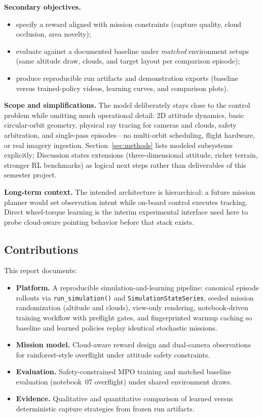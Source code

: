 \textbf{Secondary objectives.}
\begin{itemize}
  \item specify a reward aligned with mission constraints (capture quality, cloud occlusion, area novelty);
  \item evaluate against a documented baseline under \emph{matched} environment setups (same altitude draw, clouds, and target layout per comparison episode);
  \item produce reproducible run artifacts and demonstration exports (baseline versus trained-policy videos, learning curves, and comparison plots).
\end{itemize}

\textbf{Scope and simplifications.}
The model deliberately stays close to the control problem while omitting much operational detail: 2D attitude dynamics, basic circular-orbit geometry, physical ray tracing for cameras and clouds, safety arbitration, and single-pass episodes---no multi-orbit scheduling, flight hardware, or real imagery ingestion.
Section~\ref{sec:methods} lists modeled subsystems explicitly; Discussion states extensions (three-dimensional attitude, richer terrain, stronger RL benchmarks) as logical next steps rather than deliverables of this semester project.

\textbf{Long-term context.}
The intended architecture is hierarchical: a future mission planner would set observation intent while on-board control executes tracking.
Direct wheel-torque learning is the interim experimental interface used here to probe cloud-aware pointing behavior before that stack exists.

\subsection{Contributions}
This report documents:
\begin{itemize}
  \item \textbf{Platform.} A reproducible simulation-and-learning pipeline: canonical episode rollouts via \texttt{run\_simulation()} and \texttt{SimulationStateSeries}, seeded mission randomization (altitude and clouds), view-only rendering, notebook-driven training workflow with preflight gates, and fingerprinted warmup caching so baseline and learned policies replay identical stochastic missions.
  \item \textbf{Mission model.} Cloud-aware reward design and dual-camera observations for rainforest-style overflight under attitude safety constraints.
  \item \textbf{Evaluation.} Safety-constrained MPO training and matched baseline evaluation (notebook~07 overflight) under shared environment draws.
  \item \textbf{Evidence.} Qualitative and quantitative comparison of learned versus deterministic capture strategies from frozen run artifacts.
\end{itemize}

